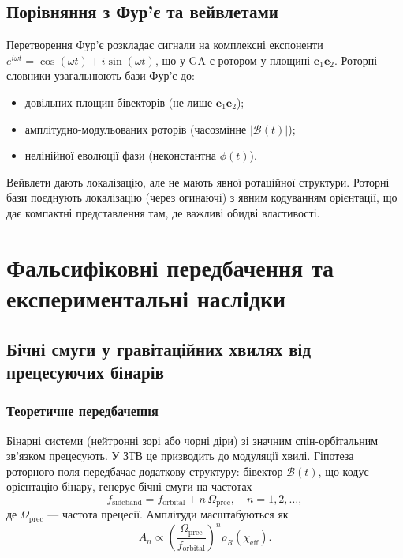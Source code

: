 \documentclass[11pt,a4paper]{article}
\newcommand{\e}{\mathbf{e}}
\newcommand{\Biv}{\mathcal{B}}
\theoremstyle{definition}
\theoremstyle{plain}
\theoremstyle{remark}
\begin{document}
\subsection{Порівняння з Фур’є та вейвлетами}

Перетворення Фур’є розкладає сигнали на комплексні експоненти $e^{i\omega t} = \cos(\omega t) + i\sin(\omega t)$, що у GA є ротором у площині $\e_1\e_2$. Роторні словники узагальнюють бази Фур’є до:
\begin{itemize}
  \item довільних площин бівекторів (не лише $\e_1\e_2$);
  \item амплітудно-модульованих роторів (часозмінне $|\Biv(t)|$);
  \item нелінійної еволюції фази (неконстантна $\phi(t)$).
\end{itemize}

Вейвлети дають локалізацію, але не мають явної ротаційної структури. Роторні бази поєднують локалізацію (через огинаючі) з явним кодуванням орієнтації, що дає компактні представлення там, де важливі обидві властивості.

\vspace{1em}

\section{Фальсифіковні передбачення та експериментальні наслідки}\label{sec:predictions}

\subsection{Бічні смуги у гравітаційних хвилях від прецесуючих бінарів}

\subsubsection{Теоретичне передбачення}

Бінарні системи (нейтронні зорі або чорні діри) зі значним спін-орбітальним зв’язком прецесують. У ЗТВ це призводить до модуляції хвилі. Гіпотеза роторного поля передбачає додаткову структуру: бівектор $\Biv(t)$, що кодує орієнтацію бінару, генерує бічні смуги на частотах
\begin{equation}
f_{\text{sideband}} = f_{\text{orbital}} \pm n\,\Omega_{\text{prec}}, \quad n=1,2,\ldots,
\end{equation}
де $\Omega_{\text{prec}}$ — частота прецесії. Амплітуди масштабуються як
\begin{equation}
A_n \propto \left(\frac{\Omega_{\text{prec}}}{f_{\text{orbital}}}\right)^n \rho_R(\chi_{\text{eff}}).
\end{equation}
\end{document}
